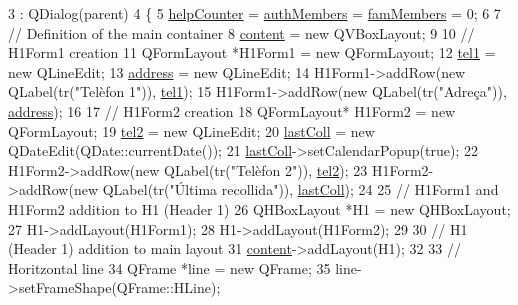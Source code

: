 \begin{DoxyCode}
3                                     : QDialog(parent)
4 \{
5     \hyperlink{class_ins_dialog_aa67a0256243ba4ca9bb6623610ad3f3a}{helpCounter} = \hyperlink{class_ins_dialog_a665468f228a04cf077de009d22736f21}{authMembers} = \hyperlink{class_ins_dialog_ac1fbb6dd4e8c3828826a98c3946935a3}{famMembers} = 0;
6     
7     \textcolor{comment}{// Definition of the main container}
8     \hyperlink{class_ins_dialog_a9b0df6254c3f39e812bbeb0ef85c1d0c}{content} = \textcolor{keyword}{new} QVBoxLayout;
9     
10     \textcolor{comment}{// H1Form1 creation}
11     QFormLayout *H1Form1 = \textcolor{keyword}{new} QFormLayout;
12     \hyperlink{class_ins_dialog_a7dc562149fa67417983c78fe2621d7f9}{tel1} = \textcolor{keyword}{new} QLineEdit;
13     \hyperlink{class_ins_dialog_a14da50d5cdf18e266b1d198ebbd20770}{address} = \textcolor{keyword}{new} QLineEdit;
14     H1Form1->addRow(\textcolor{keyword}{new} QLabel(tr(\textcolor{stringliteral}{"Telèfon 1"})), \hyperlink{class_ins_dialog_a7dc562149fa67417983c78fe2621d7f9}{tel1});
15     H1Form1->addRow(\textcolor{keyword}{new} QLabel(tr(\textcolor{stringliteral}{"Adreça"})), \hyperlink{class_ins_dialog_a14da50d5cdf18e266b1d198ebbd20770}{address});
16     
17     \textcolor{comment}{// H1Form2 creation}
18     QFormLayout* H1Form2 = \textcolor{keyword}{new} QFormLayout;
19     \hyperlink{class_ins_dialog_a79832ba6767602ed1d07b9b707bbfd1f}{tel2} = \textcolor{keyword}{new} QLineEdit;
20     \hyperlink{class_ins_dialog_a945a99c1652d647dbab8dc25df556828}{lastColl} = \textcolor{keyword}{new} QDateEdit(QDate::currentDate());
21     \hyperlink{class_ins_dialog_a945a99c1652d647dbab8dc25df556828}{lastColl}->setCalendarPopup(\textcolor{keyword}{true});
22     H1Form2->addRow(\textcolor{keyword}{new} QLabel(tr(\textcolor{stringliteral}{"Telèfon 2"})), \hyperlink{class_ins_dialog_a79832ba6767602ed1d07b9b707bbfd1f}{tel2});
23     H1Form2->addRow(\textcolor{keyword}{new} QLabel(tr(\textcolor{stringliteral}{"Última recollida"})), \hyperlink{class_ins_dialog_a945a99c1652d647dbab8dc25df556828}{lastColl});    
24     
25     \textcolor{comment}{// H1Form1 and H1Form2 addition to H1 (Header 1)}
26     QHBoxLayout *H1 = \textcolor{keyword}{new} QHBoxLayout;
27     H1->addLayout(H1Form1);
28     H1->addLayout(H1Form2);
29     
30     \textcolor{comment}{// H1 (Header 1) addition to main layout}
31     \hyperlink{class_ins_dialog_a9b0df6254c3f39e812bbeb0ef85c1d0c}{content}->addLayout(H1);
32     
33     \textcolor{comment}{// Horitzontal line}
34     QFrame *line = \textcolor{keyword}{new} QFrame;
35     line->setFrameShape(QFrame::HLine);

\end{DoxyCode}
